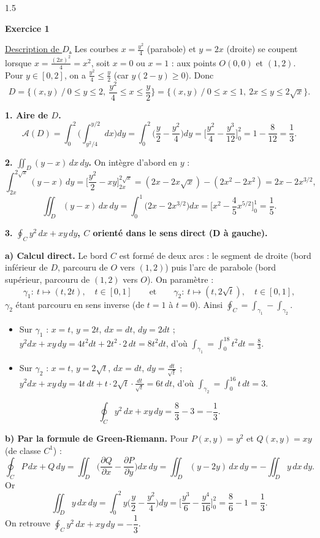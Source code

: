 \documentclass[12pt]{article}
\begin{document}
\begin{spacing}{1.5}

\textbf{Exercice 1}

\underline{Description de $D$.} Les courbes $x=\frac{y^2}{4}$ (parabole) et $y=2x$ (droite) se coupent lorsque $x=\frac{(2x)^2}{4}=x^2$, soit $x=0$ ou $x=1$ : aux points $O(0,0)$ et $(1,2)$. Pour $y\in[0,2]$, on a $\frac{y^2}{4}\le\frac y2$ (car $y(2-y)\ge0$). Donc
\[
D=\Big\{(x,y)\ /\ 0\le y\le2,\ \frac{y^2}{4}\le x\le\frac y2\Big\}=\Big\{(x,y)\ /\ 0\le x\le1,\ 2x\le y\le2\sqrt x\Big\}.
\]

\textbf{1. Aire de $D$.}
\[
\mathcal{A}(D)=\int_0^2\Big(\int_{y^2/4}^{y/2}dx\Big)dy=\int_0^2\Big(\frac y2-\frac{y^2}{4}\Big)dy=\Big[\frac{y^2}{4}-\frac{y^3}{12}\Big]_0^2=1-\frac{8}{12}=\boxed{\frac13}.
\]

\textbf{2. $\displaystyle\iint_D(y-x)\,dx\,dy$.} On intègre d'abord en $y$ :
\[
\int_{2x}^{2\sqrt x}(y-x)\,dy=\Big[\frac{y^2}{2}-xy\Big]_{2x}^{2\sqrt x}=(2x-2x\sqrt x)-(2x^2-2x^2)=2x-2x^{3/2},
\]
\[
\iint_D(y-x)\,dx\,dy=\int_0^1\big(2x-2x^{3/2}\big)dx=\Big[x^2-\frac45x^{5/2}\Big]_0^1=\boxed{\frac15}.
\]

\textbf{3. $\displaystyle\oint_Cy^2\,dx+xy\,dy$, $C$ orienté dans le sens direct (D à gauche).}

\textbf{a) Calcul direct.} Le bord $C$ est formé de deux arcs : le segment de droite (bord inférieur de $D$, parcouru de $O$ vers $(1,2)$) puis l'arc de parabole (bord supérieur, parcouru de $(1,2)$ vers $O$). On paramètre :
\[
\gamma_1:\ t\mapsto(t,2t),\quad t\in[0,1]\qquad\text{et}\qquad \gamma_2:\ t\mapsto(t,2\sqrt t),\quad t\in[0,1],
\]
$\gamma_2$ étant parcouru en sens inverse (de $t=1$ à $t=0$). Ainsi $\oint_C=\int_{\gamma_1}-\int_{\gamma_2}$.
\begin{itemize}
\item Sur $\gamma_1$ : $x=t$, $y=2t$, $dx=dt$, $dy=2dt$ ; $y^2dx+xy\,dy=4t^2dt+2t^2\cdot2\,dt=8t^2dt$, d'où $\displaystyle\int_{\gamma_1}=\int_0^18t^2dt=\frac83$.
\item Sur $\gamma_2$ : $x=t$, $y=2\sqrt t$, $dx=dt$, $dy=\frac{dt}{\sqrt t}$ ; $y^2dx+xy\,dy=4t\,dt+t\cdot2\sqrt t\cdot\frac{dt}{\sqrt t}=6t\,dt$, d'où $\displaystyle\int_{\gamma_2}=\int_0^16t\,dt=3$.
\end{itemize}
\[
\oint_Cy^2\,dx+xy\,dy=\frac83-3=\boxed{-\frac13}.
\]

\textbf{b) Par la formule de Green-Riemann.} Pour $P(x,y)=y^2$ et $Q(x,y)=xy$ (de classe $C^1$) :
\[
\oint_CP\,dx+Q\,dy=\iint_D\Big(\frac{\partial Q}{\partial x}-\frac{\partial P}{\partial y}\Big)dx\,dy=\iint_D(y-2y)\,dx\,dy=-\iint_Dy\,dx\,dy .
\]
Or
\[
\iint_Dy\,dx\,dy=\int_0^2y\Big(\frac y2-\frac{y^2}{4}\Big)dy=\Big[\frac{y^3}{6}-\frac{y^4}{16}\Big]_0^2=\frac86-1=\frac13 .
\]
On retrouve $\oint_Cy^2\,dx+xy\,dy=-\dfrac13$.


\end{spacing}
\end{document}
